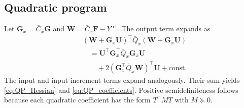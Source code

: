 \documentclass[journal]{IEEEtran}
\newcommand{\mF}{\mathbf{F}}
\newcommand{\mG}{\mathbf{G}}
\newcommand{\mU}{\mathbf{U}}
\newcommand{\mW}{\mathbf{W}}
\begin{document}
\subsection*{Quadratic program}
Let $\mG_x=\bar C_x\mG$ and $\mW=\bar C_x\mF-Y^{\mathrm{ref}}$. The output term expands as
\begin{equation}
    \begin{aligned}
    &(\mW+\mG_x\mU)^\top\bar Q_x(\mW+\mG_x\mU)\\
    &\quad=\mU^\top\mG_x^\top\bar Q_x\mG_x\mU\\
    &\qquad+2(\mG_x^\top\bar Q_x\mW)^\top\mU+\mathrm{const}.
    \end{aligned}
\end{equation}
The input and input-increment terms expand analogously. Their sum yields \eqref{eq:QP_Hessian} and \eqref{eq:QP_coefficients}. Positive semidefiniteness follows because each quadratic coefficient has the form $T^\top MT$ with $M\succeq0$.
\end{document}
